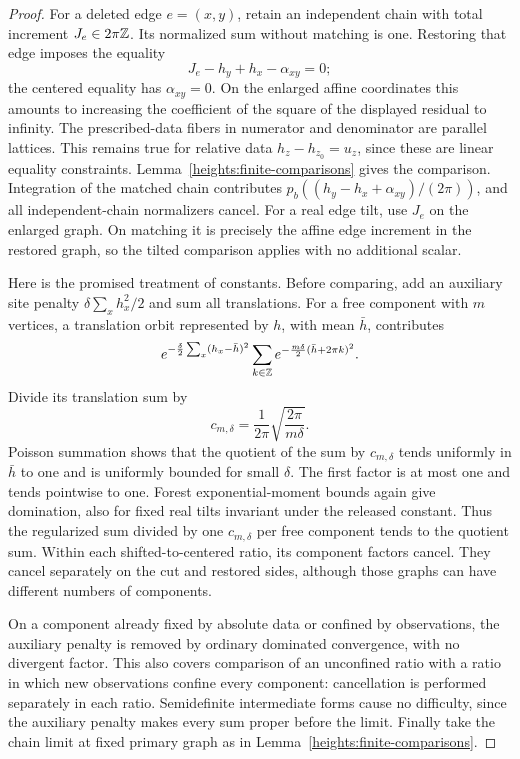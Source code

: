 \begin{proof}
For a deleted edge \(e=(x,y)\), retain an independent chain with total
increment \(J_e\in2\pi\mathbb Z\). Its normalized sum without matching is
one. Restoring that edge imposes the equality
\[
                 J_e-h_y+h_x-\alpha_{xy}=0;
\]
the centered equality has \(\alpha_{xy}=0\).
On the enlarged affine coordinates this amounts to increasing the
coefficient of the square of the displayed residual to infinity.
The prescribed-data fibers in numerator and denominator are parallel
lattices. This remains true for relative data
\(h_z-h_{z_0}=u_z\), since these are linear equality constraints.
Lemma~\ref{heights:finite-comparisons} gives the comparison.
Integration of the matched chain contributes
\(p_b((h_y-h_x+\alpha_{xy})/(2\pi))\), and all independent-chain
normalizers cancel. For a real edge tilt, use \(J_e\) on the enlarged
graph. On matching it is precisely the affine edge increment in
the restored graph, so the tilted comparison applies with no
additional scalar.

Here is the promised treatment of constants. Before comparing, add
an auxiliary site penalty \(\delta\sum_xh_x^2/2\) and sum all
translations. For a free component with \(m\) vertices, a translation
orbit represented by \(h\), with mean \(\bar h\), contributes
\[
 e^{-\frac\delta2\sum_x(h_x-\bar h)^2}
 \sum_{k\in\mathbb Z}e^{-\frac{m\delta}{2}(\bar h+2\pi k)^2}.
\]
Divide its translation sum by
\[
                    c_{m,\delta}
                    =\frac1{2\pi}\sqrt{\frac{2\pi}{m\delta}}.
\]
Poisson summation shows that the quotient of the sum by
\(c_{m,\delta}\) tends uniformly in \(\bar h\) to one and is
uniformly bounded for small \(\delta\). The first factor is at
most one and tends pointwise to one. Forest exponential-moment
bounds again give domination, also for fixed real tilts invariant
under the released constant. Thus the regularized sum divided by
one \(c_{m,\delta}\) per free component tends to the quotient sum.
Within each shifted-to-centered ratio, its component factors cancel.
They cancel separately on the cut and restored sides, although
those graphs can have different numbers of components.

On a component already fixed by absolute data or confined by
observations, the auxiliary penalty is removed by ordinary dominated
convergence, with no divergent factor. This also covers comparison
of an unconfined ratio with a ratio in which new observations confine
every component: cancellation is performed separately in each ratio.
Semidefinite intermediate forms cause no difficulty, since the
auxiliary penalty makes every sum proper before the limit. Finally
take the chain limit at fixed primary graph as in
Lemma~\ref{heights:finite-comparisons}.
\end{proof}

